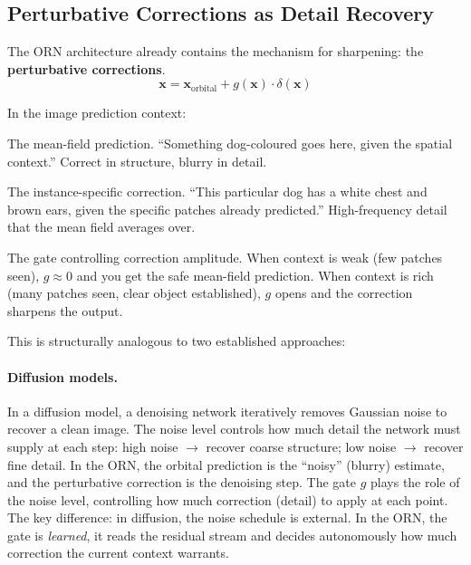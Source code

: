 \documentclass[11pt, a4paper]{article}
\newcommand{\x}{\mathbf{x}}
\theoremstyle{plain}
\theoremstyle{remark}
\begin{document}
\subsection{Perturbative Corrections as Detail Recovery}

The ORN architecture already contains the mechanism for sharpening: the \textbf{perturbative corrections}.
\begin{equation}
    \x = \x_{\text{orbital}} + g(\x) \cdot \delta(\x)
\end{equation}

In the image prediction context:
\begin{description}[nosep, leftmargin=1.5em]
    \item[$\x_{\text{orbital}}$:] The mean-field prediction. ``Something dog-coloured goes here, given the spatial context.'' Correct in structure, blurry in detail.
    \item[$\delta(\x)$:] The instance-specific correction. ``This particular dog has a white chest and brown ears, given the specific patches already predicted.'' High-frequency detail that the mean field averages over.
    \item[$g(\x)$:] The gate controlling correction amplitude. When context is weak (few patches seen), $g \approx 0$ and you get the safe mean-field prediction. When context is rich (many patches seen, clear object established), $g$ opens and the correction sharpens the output.
\end{description}

This is structurally analogous to two established approaches:

\paragraph{Diffusion models.}
In a diffusion model, a denoising network iteratively removes Gaussian noise to recover a clean image.
The noise level controls how much detail the network must supply at each step: high noise $\to$ recover coarse structure; low noise $\to$ recover fine detail.
In the ORN, the orbital prediction is the ``noisy'' (blurry) estimate, and the perturbative correction is the denoising step.
The gate $g$ plays the role of the noise level, controlling how much correction (detail) to apply at each point.
The key difference: in diffusion, the noise schedule is external.
In the ORN, the gate is \emph{learned}, it reads the residual stream and decides autonomously how much correction the current context warrants.
\end{document}
